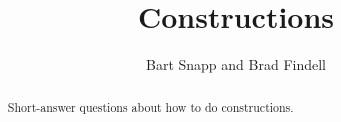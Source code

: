 \documentclass[nooutcomes]{ximera}
\title{Constructions}
\author{Bart Snapp and Brad Findell}
\begin{document}
\begin{abstract}
Short-answer questions about how to do constructions. 
\end{abstract}
\maketitle


%
\end{document}

